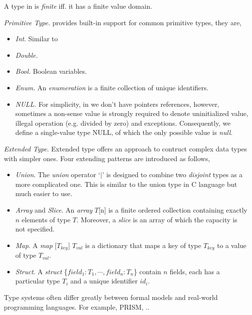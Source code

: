 \begin{definition}
    A type in \lang{} is \emph{finite} iff. it has a finite value domain.
\end{definition}


\noindent\emph{Primitive Type.} \lang{} provides built-in support for common primitive types, they are,
\begin{itemize}
    \item \emph{Int}. Similar to  
    \item \emph{Double.}
    \item \emph{Bool.} Boolean variables.
    \item \emph{Enum.} An \emph{enumeration} is a finite collection of unique identifiers.
    \item \emph{NULL.} For simplicity, in \lang{} we don't have pointers references, however, sometimes a non-sense value is strongly required to denote uninitialized value, illegal operation (e.g. divided by zero) and exceptions. Consequently, we define a single-value type NULL, of which the only possible value is \emph{null}.
\end{itemize}

\noindent\emph{Extended Type.} Extended type offers an approach to contruct complex data types with simpler ones. Four extending patterns are introduced as follows,
\begin{itemize}
    \item \emph{Union}. The \emph{union} operator `$|$' is designed to combine two \emph{disjoint} types as a more complicated one. This is similar to the union type in C language but much easier to use.
    \item \emph{Array} and \emph{Slice}. An \emph{array} $T$[n] is a finite ordered collection containing exactly $n$ elements of type $T$. Moreover, a \emph{slice} is an array of which the capacity is not specified.
    \item \emph{Map}. A \emph{map }[$T_{key}$] $T_{val}$ is a dictionary that maps a key of type $T_{key}$ to a value of type $T_{val}$.
    \item \emph{Struct}. A \emph{struct }\{$field_1:T_1,\cdots,field_n:T_n$\} contain $n$ fields, each has a particular type $T_i$ and a unique identifier $id_i$.
\end{itemize}

Type systems often differ greatly between formal models and real-world programming languages. For example, PRISM\cite{KwiatkowskaCav2011}, ..

